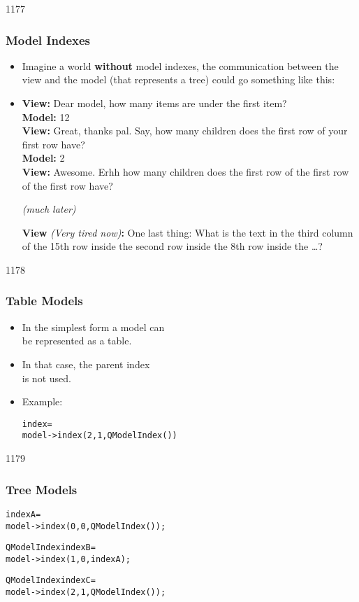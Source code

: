 \begin{slide}{1177}\frametitle{Model Indexes}
\begin{itemize}
\item Imagine a world \textbf{without} model indexes, the communication
  between the view and the model (that represents a tree) could go something like this:
\item \textbf{View:} Dear model, how many items are under the first item?\\
\textbf{Model:} 12\\
\textbf{View:} Great, thanks pal. Say, how many children does the first row
of your first row have?\\
\textbf{Model:} 2\\
\textbf{View:} Awesome. Erhh how many children does the first row of the
first row of the first row have?\\
\centerline{\textit{(much later)}}\strut
\textbf{View} \textit{(Very tired now)}\textbf{:} One last thing: What is
the text in the third column of the 15th row inside the second row inside
the 8th row inside the \ldots?
\end{itemize}
\end{slide}

\begin{slide}[fragile]{1178}
\frametitle{Table Models}
\begin{itemize}
\item In the simplest form a model can\\
  be represented as a table.
\item In that case, the parent index\\
  is not used.
\item Example:
\begin{alltt}
 index = 
model->index(2,1, QModelIndex())
\end{alltt}
\end{itemize}
\end{slide}

\begin{slide}[fragile]{1179}
\frametitle{Tree Models}
\begin{alltt}
 indexA = 
  model->index(0, 0, QModelIndex());

QModelIndex indexB = 
  model->index(1, 0, indexA);

QModelIndex indexC = 
  model->index(2, 1, QModelIndex());
\end{alltt}
\end{slide}


